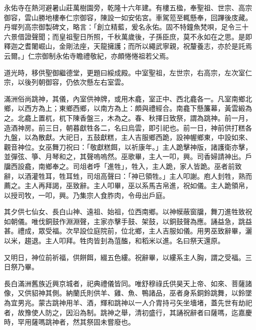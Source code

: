 \begin{pinyinscope}
永佑寺在熱河避暑山莊萬樹園旁，乾隆十六年建。有樓五楹，奉聖祖、世宗、高宗御容，雲山勝地樓奉仁宗御容，陳設一如安佑宮。車駕蒞至輒懸奉，回蹕後庋藏。丹墀列高宗御製碑文，略言：「創立精藍，爰名永佑。固不特鐘魚梵唄，足令三十六景借證聲聞；而皇祖聖日所照，千秋萬歲後，子孫臣庶，莫不永如在之思。是即釋迦之耆闍崛山，金剛法座，天龍擁護；而所以繩武寧親，祝釐養志，亦於是託焉云爾。」仁宗御制永佑寺瞻禮敬紀，亦頗惓惓祖若父焉。

道光時，移供聖御繼德堂，更題曰綏成殿。中室聖祖，左世宗，右高宗，左次室仁宗，以後列朝御容，仍依次懸左右室雲。

滿洲俗尚跳神，其儀，內室供神牌，或用木龕，室正中、西北龕各一。凡室南鄉北鄉，以西方為上；東鄉西鄉，以南方為上：頗與禮經合。南龕下懸簾幕，黃雲緞為之。北龕上置杌，杌下陳香盤三，木為之。春、秋擇日致祭，謂為跳神。前一月，造酒神房。前三日，朝暮獻牲各二，名曰烏雲，即引祀也。前一日，神前供打糕各九盤，以為散獻。大祀日，五鼓獻糕，主人吉服鄉西跪，設神幄鄉東，中設如來、觀音神位。女巫舞刀祝曰：「敬獻糕餌，以祈康年。」主人跪擊神版，諸護衛亦擊，並彈弦、箏、月琴和之，其聲嗚嗚然。巫歌畢，主人一叩，興。司香婦請神出。戶牖西設龕，南鄉奉之。司俎者呼「進牲」，牲入，主人跪，家人皆跪。巫者前致辭，以酒灌牲耳，牲耳甡，司俎高聲曰：「神已領牲。」主人叩謝。庖人刲牲，熟而薦之。主人再拜謁，巫致辭。主人叩畢，巫以系馬吉帛進，祝如儀。主人跪領帛，以授司牧，一叩，興。乃集宗人食胙肉，令毋出戶庭。

其夕供七仙女、長白山神、遠祖、始祖，位西南鄉。以神幙蔽窗牖，舞刀進牲致祝如朝儀。唯伐銅鼓作淵淵聲，主家亦擊手鼓、架鼓，以銅鼓聲為應。誦益急，跳益甚。禮成，眾受福。次早設位庭院前，位北鄉，主人吉服如儀。用男巫致辭畢，灑以米，趨退。主人叩拜。牲肉皆刲為菹醢，和稻米以進。名曰祭天還原。

又明日，神位前祈福，供餅餌，綴五色縷。祝辭畢，以縷系主人胸，謂之受福。三日祭乃畢。

長白滿洲舊族近興京城者，祀典禮儀皆同。唯舒穆祿氏供昊天上帝、如來、菩薩諸像，又供貂神其側。納蘭氏則供羊、雞、魚、鴨諸品，巫者身系銅鈴跳舞，以鈴墜為宜男兆。蒙古跳神用羊、酒，輝和跳神以一人介胄持弓矢坐墻堵，蓋先世有劫祀者，故豫使人防之，因沿為制。跳神之舉，清初盛行，其誦祝辭者曰薩嗎，迄嘉慶時，罕用薩嗎跳神者，然其祭固未嘗廢也。


\end{pinyinscope}